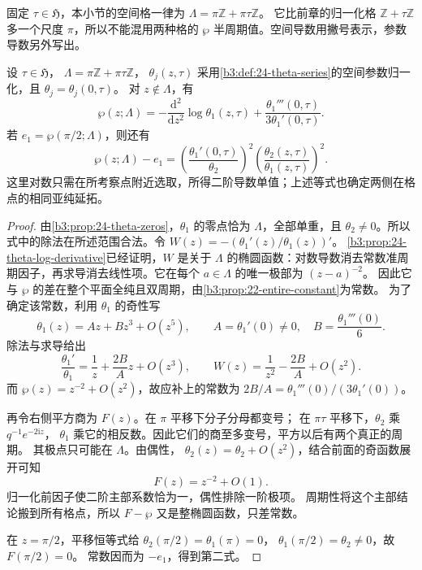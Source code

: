 固定 \(\tau\in\mathfrak H\)，本小节的空间格一律为
\(\Lambda=\pi\mathbb Z+\pi\tau\mathbb Z\)。
它比前章的归一化格 \(\mathbb Z+\tau\mathbb Z\) 多一个尺度 \(\pi\)，所以不能混用两种格的 \(\wp\) 半周期值。空间导数用撇号表示，参数导数另外写出。

\begin{proposition}\label{b3:prop:24-theta-wp}
设 \(\tau\in\mathfrak H\)，
\(\Lambda=\pi\mathbb Z+\pi\tau\mathbb Z\)，
\(\theta_j(z,\tau)\) 采用\cref{b3:def:24-theta-series}的空间参数归一化，且
\(\theta_j=\theta_j(0,\tau)\)。
对 \(z\notin\Lambda\)，有
\[
\wp(z;\Lambda)
=-\frac{\mathrm d^2}{\mathrm dz^2}\log\theta_1(z,\tau)
 +\frac{\theta_1'''(0,\tau)}{3\theta_1'(0,\tau)}.
\]
若 \(e_1=\wp(\pi/2;\Lambda)\)，则还有
\[
\wp(z;\Lambda)-e_1
=\left(\frac{\theta_1'(0,\tau)}{\theta_2}\right)^2
 \left(\frac{\theta_2(z,\tau)}{\theta_1(z,\tau)}\right)^2.
\]
这里对数只需在所考察点附近选取，所得二阶导数单值；上述等式也确定两侧在格点的相同亚纯延拓。
\end{proposition}
\begin{proof}
由\cref{b3:prop:24-theta-zeros}，\(\theta_1\) 的零点恰为 \(\Lambda\)，全部单重，且 \(\theta_2\ne0\)。所以式中的除法在所述范围合法。令
\(W(z)=-(\theta_1'(z)/\theta_1(z))'\)。
\cref{b3:prop:24-theta-log-derivative}已经证明，\(W\) 是关于 \(\Lambda\) 的椭圆函数：对数导数消去常数准周期因子，再求导消去线性项。它在每个 \(a\in\Lambda\) 的唯一极部为 \((z-a)^{-2}\)。
因此它与 \(\wp\) 的差在整个平面全纯且双周期，由\cref{b3:prop:22-entire-constant}为常数。
为了确定该常数，利用 \(\theta_1\) 的奇性写
\[
\theta_1(z)=Az+Bz^3+O(z^5),\qquad
A=\theta_1'(0)\ne0,\quad B=\frac{\theta_1'''(0)}6.
\]
除法与求导给出
\[
\frac{\theta_1'}{\theta_1}=\frac1z+\frac{2B}{A}z+O(z^3),
\qquad
W(z)=\frac1{z^2}-\frac{2B}{A}+O(z^2).
\]
而 \(\wp(z)=z^{-2}+O(z^2)\)，故应补上的常数为
\(2B/A=\theta_1'''(0)/(3\theta_1'(0))\)。

再令右侧平方商为 \(F(z)\)。在 \(\pi\) 平移下分子分母都变号；
在 \(\pi\tau\) 平移下，\(\theta_2\) 乘 \(q^{-1}e^{-2\mathrm{i}z}\)，
\(\theta_1\) 乘它的相反数。因此它们的商至多变号，平方以后有两个真正的周期。
其极点只可能在 \(\Lambda\)。由偶性，
\(\theta_2(z)=\theta_2+O(z^2)\)，结合前面的奇函数展开可知
\[
F(z)=z^{-2}+O(1).
\]
归一化前因子使二阶主部系数恰为一，偶性排除一阶极项。
周期性将这个主部结论搬到所有格点，所以 \(F-\wp\) 又是整椭圆函数，只差常数。

在 \(z=\pi/2\)，平移恒等式给
\(\theta_2(\pi/2)=\theta_1(\pi)=0\)，
\(\theta_1(\pi/2)=\theta_2\ne0\)，故 \(F(\pi/2)=0\)。
常数因而为 \(-e_1\)，得到第二式。
\end{proof}

